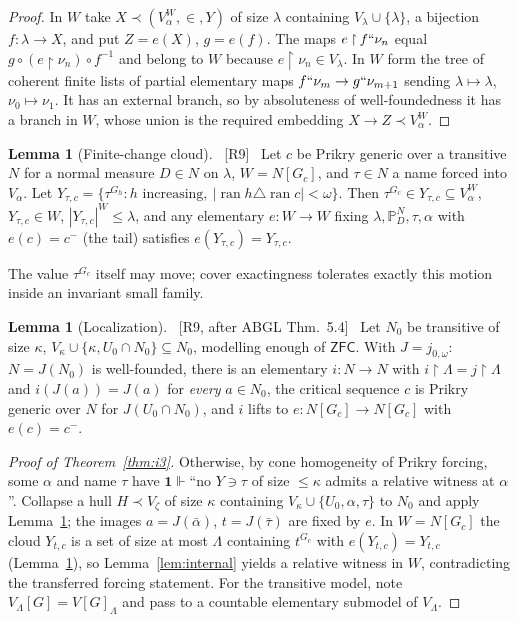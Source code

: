 \documentclass[11pt,letterpaper]{article}
\theoremstyle{definition}
\newtheorem{lemma}[definition]{Lemma}
\numberwithin{equation}{section}
\newcommand{\ZFC}{\mathsf{ZFC}}
\newcommand{\ran}{\operatorname{ran}}
\newcommand{\restr}{\mathbin{\upharpoonright}}
\newcommand{\PP}{\mathbb P}
\newcommand{\src}[1]{\unskip\ {\normalfont\small\sffamily\color{Olive}[#1]}\ }
\begin{document}
\begin{proof}
In $W$ take $X\prec(V^W_\alpha,\in,Y)$ of size $\lambda$ containing $V_\lambda\cup\{\lambda\}$, a bijection $f:\lambda\to X$, and put $Z=e(X)$, $g=e(f)$. The maps $e\restr f``\nu_n$ equal $g\circ(e\restr\nu_n)\circ f^{-1}$ and belong to $W$ because $e\restr\nu_n\in V_\lambda$. In $W$ form the tree of coherent finite lists of partial elementary maps $f``\nu_m\to g``\nu_{m+1}$ sending $\lambda\mapsto\lambda$, $\nu_0\mapsto\nu_1$. It has an external branch, so by absoluteness of well-foundedness it has a branch in $W$, whose union is the required embedding $X\to Z\prec V^W_\alpha$.
\end{proof}

\begin{lemma}[Finite-change cloud]\label{lem:cloud}\src{R9}
Let $c$ be Prikry generic over a transitive $N$ for a normal measure $D\in N$ on $\lambda$, $W=N[G_c]$, and $\tau\in N$ a name forced into $V_\alpha$. Let $Y_{\tau,c}=\{\tau^{G_h}:h\text{ increasing},\ |\ran h\triangle\ran c|<\omega\}$. Then $\tau^{G_c}\in Y_{\tau,c}\subseteq V^W_\alpha$, $Y_{\tau,c}\in W$, $|Y_{\tau,c}|^W\le\lambda$, and any elementary $e:W\to W$ fixing $\lambda,\PP^N_D,\tau,\alpha$ with $e(c)=c^-$ (the tail) satisfies $e(Y_{\tau,c})=Y_{\tau,c}$.
\end{lemma}

The value $\tau^{G_c}$ itself may move; cover exactingness tolerates exactly this motion inside an invariant small family.

\begin{lemma}[Localization]\label{lem:local}\src{R9, after ABGL Thm.~5.4}
Let $N_0$ be transitive of size $\kappa$, $V_\kappa\cup\{\kappa,U_0\cap N_0\}\subseteq N_0$, modelling enough of $\ZFC$. With $J=j_{0,\omega}$: $N=J(N_0)$ is well-founded, there is an elementary $i:N\to N$ with $i\restr\Lambda=j\restr\Lambda$ and $i(J(a))=J(a)$ for \emph{every} $a\in N_0$, the critical sequence $c$ is Prikry generic over $N$ for $J(U_0\cap N_0)$, and $i$ lifts to $e:N[G_c]\to N[G_c]$ with $e(c)=c^-$.
\end{lemma}

\begin{proof}[Proof of Theorem~\ref{thm:i3}]
Otherwise, by cone homogeneity of Prikry forcing, some $\alpha$ and name $\tau$ have $\mathbf1\Vdash$``no $Y\ni\tau$ of size $\le\kappa$ admits a relative witness at $\alpha$''. Collapse a hull $H\prec V_\zeta$ of size $\kappa$ containing $V_\kappa\cup\{U_0,\alpha,\tau\}$ to $N_0$ and apply Lemma~\ref{lem:local}; the images $a=J(\bar\alpha)$, $t=J(\bar\tau)$ are fixed by $e$. In $W=N[G_c]$ the cloud $Y_{t,c}$ is a set of size at most $\Lambda$ containing $t^{G_c}$ with $e(Y_{t,c})=Y_{t,c}$ (Lemma~\ref{lem:cloud}), so Lemma~\ref{lem:internal} yields a relative witness in $W$, contradicting the transferred forcing statement. For the transitive model, note $V_\Lambda[G]=V[G]_\Lambda$ and pass to a countable elementary submodel of $V_\Lambda$.
\end{proof}
\end{document}
